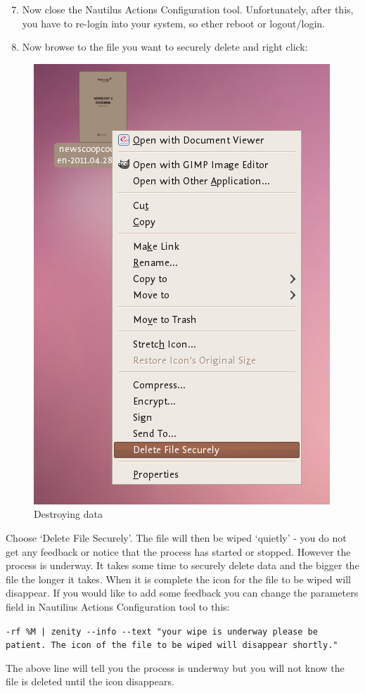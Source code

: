 \begin{enumerate}[1.]
\setcounter{enumi}{6}
\item
  Now close the Nautilus Actions Configuration tool. Unfortunately,
  after this, you have to re-login into your system, so ether reboot or
  logout/login.
\item
  Now browse to the file you want to securely delete and right click:
\end{enumerate}
\begin{figure}[htbp]
\centering
\includegraphics{destroy_data_014.png}
\caption{Destroying data}
\end{figure}

Choose `Delete File Securely'. The file will then be wiped `quietly' -
you do not get any feedback or notice that the process has started or
stopped. However the process is underway. It takes some time to securely
delete data and the bigger the file the longer it takes. When it is
complete the icon for the file to be wiped will disappear. If you would
like to add some feedback you can change the parameters field in
Nautilius Actions Configuration tool to this:

\verb!-rf %M | zenity --info --text "your wipe is underway please be patient. The icon of the file to be wiped will disappear shortly."!

The above line will tell you the process is underway but you will not
know the file is deleted until the icon disappears.
